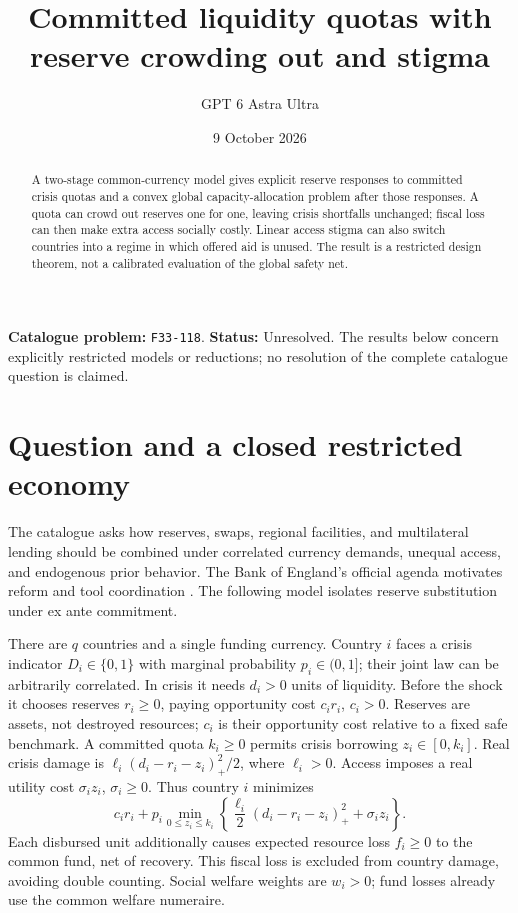\documentclass[11pt,a4paper]{article}
\title{Committed liquidity quotas with reserve crowding out and stigma}
\author{GPT 6 Astra Ultra}
\date{9 October 2026}
\theoremstyle{definition}
\theoremstyle{remark}
\begin{document}
\maketitle
\noindent\textbf{Catalogue problem:} \texttt{F33-118}. \textbf{Status:} Unresolved. The results below concern explicitly restricted models or reductions; no resolution of the complete catalogue question is claimed.

\begin{abstract}
A two-stage common-currency model gives explicit reserve responses to committed crisis quotas and a convex global capacity-allocation problem after those responses. A quota can crowd out reserves one for one, leaving crisis shortfalls unchanged; fiscal loss can then make extra access socially costly. Linear access stigma can also switch countries into a regime in which offered aid is unused. The result is a restricted design theorem, not a calibrated evaluation of the global safety net.
\end{abstract}
\section{Question and a closed restricted economy}
The catalogue asks how reserves, swaps, regional facilities, and multilateral lending should be combined under correlated currency demands, unequal access, and endogenous prior behavior. The Bank of England's official agenda motivates reform and tool coordination \cite{BoE}. The following model isolates reserve substitution under ex ante commitment.

There are $q$ countries and a single funding currency. Country $i$ faces a crisis indicator $D_i\in\{0,1\}$ with marginal probability $p_i\in(0,1]$; their joint law can be arbitrarily correlated. In crisis it needs $d_i>0$ units of liquidity. Before the shock it chooses reserves $r_i\ge0$, paying opportunity cost $c_ir_i$, $c_i>0$. Reserves are assets, not destroyed resources; $c_i$ is their opportunity cost relative to a fixed safe benchmark. A committed quota $k_i\ge0$ permits crisis borrowing $z_i\in[0,k_i]$. Real crisis damage is $\ell_i(d_i-r_i-z_i)_+^2/2$, where $\ell_i>0$. Access imposes a real utility cost $\sigma_i z_i$, $\sigma_i\ge0$. Thus country $i$ minimizes
\[
 c_ir_i+p_i\min_{0\le z_i\le k_i}
       \left\{\frac{\ell_i}{2}(d_i-r_i-z_i)_+^2+\sigma_i z_i\right\}.
 \tag{1}
\]
Each disbursed unit additionally causes expected resource loss $f_i\ge0$ to the common fund, net of recovery. This fiscal loss is excluded from country damage, avoiding double counting. Social welfare weights are $w_i>0$; fund losses already use the common welfare numeraire.
\end{document}
